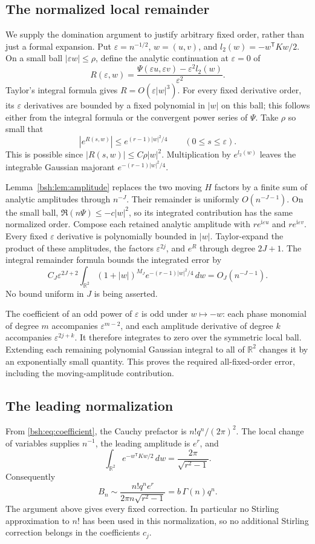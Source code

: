 \documentclass[11pt,letterpaper]{article}
\theoremstyle{remark}\newtheorem{remark}[theorem]{Remark}
\newcommand{\R}{\mathbb R}
\newcommand{\ii}{\mathrm i}
\begin{document}
\subsection{The normalized local remainder}
We supply the domination argument to justify arbitrary fixed order, rather than just a formal expansion. Put $\varepsilon=n^{-1/2}$, $w=(u,v)$, and $l_2(w)=-w^{\mathsf T}Kw/2$. On a small ball $|\varepsilon w|\leq\rho$, define the analytic continuation at $\varepsilon=0$ of
\[
 R(\varepsilon,w)
 =\frac{\Psi(\varepsilon u,\varepsilon v)-\varepsilon^2l_2(w)}{\varepsilon^2}.
\]
Taylor's integral formula gives $R=O(\varepsilon|w|^3)$. For every fixed derivative order, its $\varepsilon$ derivatives are bounded by a fixed polynomial in $|w|$ on this ball; this follows either from the integral formula or the convergent power series of $\Psi$. Take $\rho$ so small that
\[
 |e^{R(s,w)}|\leq e^{(r-1)|w|^2/4}\qquad(0\leq s\leq\varepsilon).
\]
This is possible since $|R(s,w)|\leq C\rho|w|^2$. Multiplication by $e^{l_2(w)}$ leaves the integrable Gaussian majorant $e^{-(r-1)|w|^2/4}$.

Lemma~\ref{bsh:lem:amplitude} replaces the two moving $H$ factors by a finite sum of analytic amplitudes through $n^{-J}$. Their remainder is uniformly $O(n^{-J-1})$. On the small ball, $\Re(n\Psi)\leq-c|w|^2$, so its integrated contribution has the same normalized order. Compose each retained analytic amplitude with $re^{\ii\varepsilon u}$ and $re^{\ii\varepsilon v}$. Every fixed $\varepsilon$ derivative is polynomially bounded in $|w|$. Taylor-expand the product of these amplitudes, the factors $\varepsilon^{2j}$, and $e^R$ through degree $2J+1$. The integral remainder formula bounds the integrated error by
\[
 C_J\varepsilon^{2J+2}
 \int_{\R^2}(1+|w|)^{M_J}e^{-(r-1)|w|^2/4}\,dw
 =O_J(n^{-J-1}).
\]
No bound uniform in $J$ is being asserted.

The coefficient of an odd power of $\varepsilon$ is odd under $w\mapsto-w$: each phase monomial of degree $m$ accompanies $\varepsilon^{m-2}$, and each amplitude derivative of degree $k$ accompanies $\varepsilon^{2j+k}$. It therefore integrates to zero over the symmetric local ball. Extending each remaining polynomial Gaussian integral to all of $\R^2$ changes it by an exponentially small quantity. This proves the required all-fixed-order error, including the moving-amplitude contribution.

\subsection{The leading normalization}
From \eqref{bsh:eq:coefficient}, the Cauchy prefactor is $n!q^n/(2\pi)^2$. The local change of variables supplies $n^{-1}$, the leading amplitude is $e^r$, and
\[
 \int_{\R^2}e^{-w^{\mathsf T}Kw/2}\,dw=\frac{2\pi}{\sqrt{r^2-1}}.
\]
Consequently
\[
 B_n\sim\frac{n!q^n e^r}{2\pi n\sqrt{r^2-1}}
       =b\,\Gamma(n)q^n.
\]
The argument above gives every fixed correction. In particular no Stirling approximation to $n!$ has been used in this normalization, so no additional Stirling correction belongs in the coefficients $c_j$.
\end{document}
